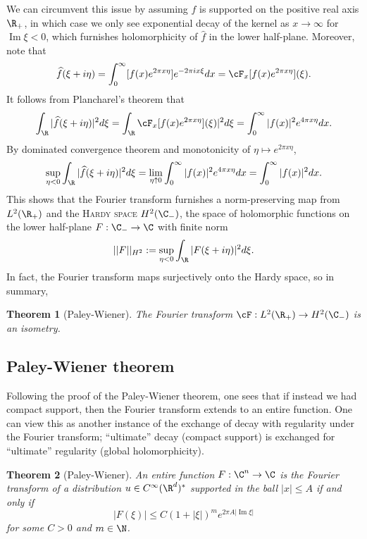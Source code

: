 \documentclass[reqno]{amsart}
\newtheorem{theorem}{Theorem}
\theoremstyle{definition}
\theoremstyle{remark}
\renewcommand{\emph}{\textsc}
\renewcommand{\Im}{\operatorname{Im}}
\begin{document}
We can circumvent this issue by assuming $f$ is supported on the positive real axis $\R_+$, in which case we only see exponential decay of the kernel as $x \to \infty$ for $\Im \xi < 0$, which furnishes holomorphicity of $\widehat f$ in the lower half-plane. Moreover, note that 
	\[ \widehat f(\xi + i \eta) =  \int_0^\infty [f(x) e^{2\pi x \eta}] e^{-2\pi i x \xi} dx = \cF_x [f(x) e^{2\pi x \eta}] (\xi). \]
It follows from Plancharel's theorem that
	\[ \int_\R |\widehat{f} (\xi + i \eta)|^2 d \xi = \int_\R \cF_x [f(x) e^{2\pi x \eta}] (\xi)|^2 d \xi =  \int_0^\infty |f(x)|^2 e^{4\pi x \eta} d x. \]
By dominated convergence theorem and monotonicity of $\eta \mapsto e^{2\pi x \eta}$, 
	\[ \sup_{\eta < 0}  \int_\R |\widehat{f} (\xi + i \eta)|^2 d \xi = \lim_{\eta \uparrow 0}\int_0^\infty |f(x)|^2 e^{4\pi x \eta}dx = \int_0^\infty |f(x)|^2 dx . \]
This shows that the Fourier transform furnishes a norm-preserving map from $L^2 (\R_+)$ and the \emph{Hardy space} $H^2 (\C_-)$, the space of holomorphic functions on the lower half-plane $F: \C_- \to \C$ with finite norm
	\[ ||F||_{H^2} := \sup_{\eta < 0} \int_\R |F(\xi + i \eta)|^2 d \xi . \]
In fact, the Fourier transform maps surjectively onto the Hardy space, so in summary, 

\begin{theorem}[Paley-Wiener]
	The Fourier transform $\cF : L^2 (\R_+) \to H^2 (\C_-)$ is an isometry. 
\end{theorem}

\subsection{Paley-Wiener theorem}

Following the proof of the Paley-Wiener theorem, one sees that if instead we had compact support, then the Fourier transform extends to an entire function. One can view this as another instance of the exchange of decay with regularity under the Fourier transform; ``ultimate'' decay (compact support) is exchanged for ``ultimate'' regularity (global holomorphicity). 

\begin{theorem}[Paley-Wiener]
	An entire function $F: \C^n \to \C$ is the Fourier transform of a distribution $u \in C^\infty (\R^d)^*$ supported in the ball $|x| \leq A$ if and only if
		\[ |F(\xi)| \leq C (1 + |\xi|)^m e^{2\pi A |\Im \xi|} \]
	for some $C > 0$ and $m \in \N$. 
\end{theorem}
\end{document}
